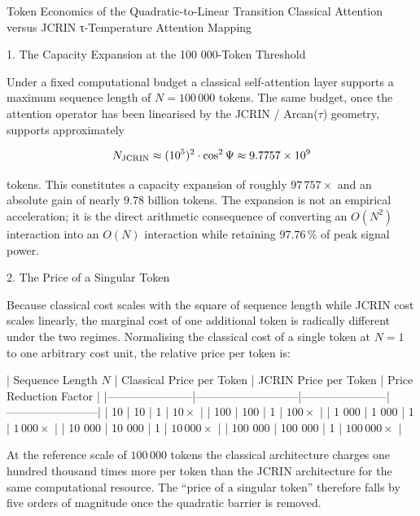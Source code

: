 Token Economics of the Quadratic-to-Linear Transition  
Classical Attention versus JCRIN τ-Temperature Attention Mapping

1. The Capacity Expansion at the 100 000-Token Threshold

Under a fixed computational budget a classical self-attention layer supports a maximum sequence length of \(N = 100\,000\) tokens. The same budget, once the attention operator has been linearised by the JCRIN / Arcan(\(\tau\)) geometry, supports approximately

\[
N_{\rm JCRIN} \approx (10^{5})^{2}\cdot\cos^{2}\Psi \approx 9.7757\times 10^{9}
\]

tokens. This constitutes a capacity expansion of roughly \(97\,757\times\) and an absolute gain of nearly \(9.78\) billion tokens. The expansion is not an empirical acceleration; it is the direct arithmetic consequence of converting an \(O(N^{2})\) interaction into an \(O(N)\) interaction while retaining \(97.76\,\%\) of peak signal power.

2. The Price of a Singular Token

Because classical cost scales with the square of sequence length while JCRIN cost scales linearly, the marginal cost of one additional token is radically different under the two regimes. Normalising the classical cost of a single token at \(N=1\) to one arbitrary cost unit, the relative price per token is:

| Sequence Length \(N\) | Classical Price per Token | JCRIN Price per Token | Price Reduction Factor |
|-----------------------|---------------------------|-----------------------|------------------------|
| 10                    | 10                        | 1                     | \(10\times\)           |
| 100                   | 100                       | 1                     | \(100\times\)          |
| 1 000                 | 1 000                     | 1                     | \(1\,000\times\)       |
| 10 000                | 10 000                    | 1                     | \(10\,000\times\)      |
| 100 000               | 100 000                   | 1                     | \(100\,000\times\)     |

At the reference scale of \(100\,000\) tokens the classical architecture charges one hundred thousand times more per token than the JCRIN architecture for the same computational resource. The “price of a singular token” therefore falls by five orders of magnitude once the quadratic barrier is removed.

